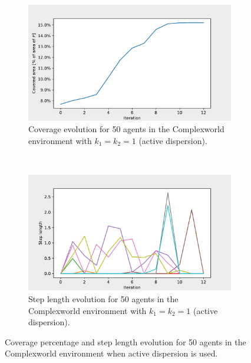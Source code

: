 \begin{figure}[H]
  \centering
  \begin{subfigure}[t]{0.5\textwidth}
    \centering
    \includegraphics[width=\textwidth]{figs/complexworld_50_agnt_k_1_0_k_2_1_area_traj.pdf}
    \caption{Coverage evolution for 50 agents in the Complexworld environment with $k_{1} = k_{2} = 1$ (active dispersion).}
    \label{fig:50_agnt_cw_k_1_0_k_2_1_a_traj}
  \end{subfigure}%
  ~ 
  \begin{subfigure}[t]{0.5\textwidth}
    \centering
    \includegraphics[width=\textwidth]{figs/complexworld_50_agnt_k_1_0_k_2_1_step_traj.pdf}
    \caption{Step length evolution for 50 agents in the Complexworld environment with $k_{1} = k_{2} = 1$ (active dispersion).}
    \label{fig:50_agnt_cw_k_1_0_k_2_1_s_traj}
  \end{subfigure}
  \caption{Coverage percentage and step length evolution for 50 agents in the Complexworld environment when active dispersion is used.}
  \label{fig:50_agnt_cw_evolution}
\end{figure}


